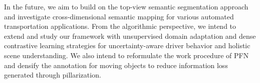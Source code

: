 \documentclass[lettersize,journal]{IEEEtran}
\begin{document}
In the future, we aim to build on the top-view semantic segmentation approach and investigate cross-dimensional semantic mapping for various automated transportation applications.
From the algorithmic perspective, we intend to extend and study our framework with unsupervised domain adaptation and dense contrastive learning strategies for uncertainty-aware driver behavior and holistic scene understanding. We also intend to reformulate the work procedure of PFN and densify the annotation for moving objects to reduce information loss generated through pillarization.



\end{document}
